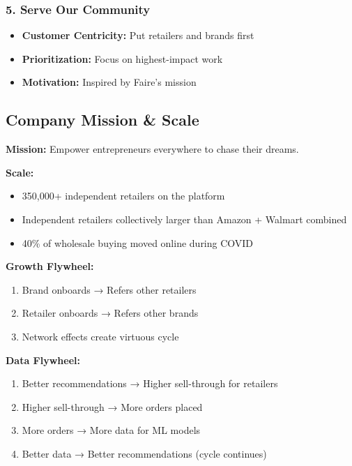 \documentclass[11pt,letterpaper]{article}
\begin{document}
\subsubsection{5. Serve Our Community}
\begin{itemize}
    \item \textbf{Customer Centricity:} Put retailers and brands first
    \item \textbf{Prioritization:} Focus on highest-impact work
    \item \textbf{Motivation:} Inspired by Faire's mission
\end{itemize}

\subsection{Company Mission \& Scale}

\textbf{Mission:} Empower entrepreneurs everywhere to chase their dreams.

\textbf{Scale:}
\begin{itemize}
    \item 350,000+ independent retailers on the platform
    \item Independent retailers collectively larger than Amazon + Walmart combined
    \item 40\% of wholesale buying moved online during COVID
\end{itemize}

\textbf{Growth Flywheel:}
\begin{enumerate}
    \item Brand onboards → Refers other retailers
    \item Retailer onboards → Refers other brands
    \item Network effects create virtuous cycle
\end{enumerate}

\textbf{Data Flywheel:}
\begin{enumerate}
    \item Better recommendations → Higher sell-through for retailers
    \item Higher sell-through → More orders placed
    \item More orders → More data for ML models
    \item Better data → Better recommendations (cycle continues)
\end{enumerate}

\end{document}
